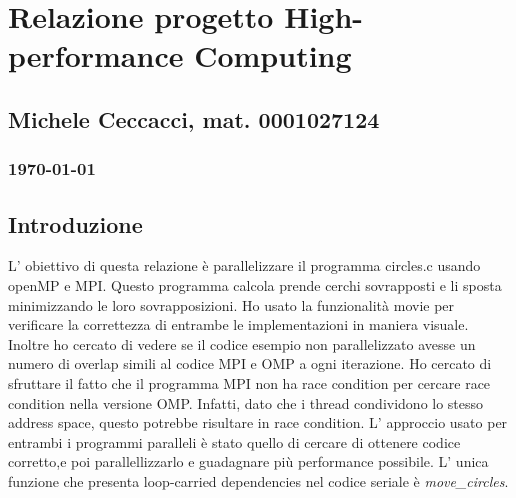 \documentclass[a4paper,11pt, twoside]{report}
\begin{document}
\section*{Relazione progetto High-performance Computing}
\subsection*{Michele Ceccacci, mat. 0001027124}
\subsubsection*{\today}

\subsection*{Introduzione}
L' obiettivo di questa relazione è parallelizzare il programma circles.c usando openMP e MPI. 
Questo programma calcola prende cerchi sovrapposti e li sposta minimizzando le loro sovrapposizioni.
Ho usato la funzionalità movie per verificare la correttezza di entrambe le implementazioni in maniera visuale. 
Inoltre ho cercato di vedere se il codice esempio non parallelizzato avesse un numero di overlap simili al codice MPI e OMP a ogni iterazione.
Ho cercato di sfruttare il fatto che il programma MPI non ha race condition per cercare race condition nella versione OMP.
Infatti, dato che i thread condividono lo stesso address space, questo potrebbe risultare in race condition. 
L' approccio usato per entrambi i programmi paralleli è stato quello di cercare di ottenere codice corretto,e poi parallellizzarlo e guadagnare più performance possibile.
L' unica funzione che presenta loop-carried dependencies nel codice seriale è \textit{move\_circles}.
\end{document}
